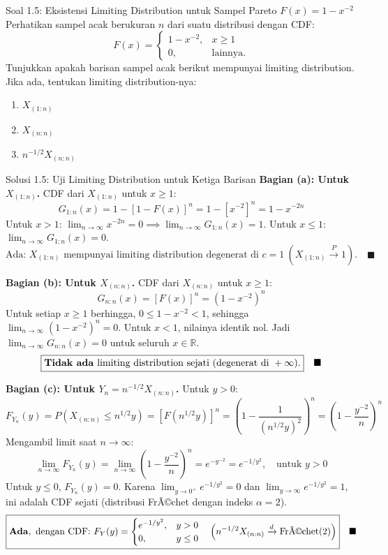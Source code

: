 \documentclass[10pt,twoside]{article}
\begin{document}
\begin{soalbox}{Soal 1.5: Eksistensi Limiting Distribution untuk Sampel Pareto $F(x) = 1 - x^{-2}$}
Perhatikan sampel acak berukuran $n$ dari suatu distribusi dengan CDF:
\[
F(x) = \begin{cases} 1 - x^{-2}, & x \ge 1 \\ 0, & \text{lainnya.} \end{cases}
\]
Tunjukkan apakah barisan sampel acak berikut mempunyai limiting distribution. Jika ada, tentukan limiting distribution-nya:
\begin{enumerate}[label=(\alph*)]
  \item $X_{(1:n)}$
  \item $X_{(n:n)}$
  \item $n^{-1/2}X_{(n:n)}$
\end{enumerate}
\end{soalbox}

\begin{solbox}{Solusi 1.5: Uji Limiting Distribution untuk Ketiga Barisan}
\textbf{Bagian (a): Untuk $X_{(1:n)}$.}
CDF dari $X_{(1:n)}$ untuk $x \ge 1$:
\[
G_{1:n}(x) = 1 - [1 - F(x)]^n = 1 - [x^{-2}]^n = 1 - x^{-2n}
\]
Untuk $x > 1$: $\lim_{n \to \infty} x^{-2n} = 0 \implies \lim_{n \to \infty} G_{1:n}(x) = 1$.
Untuk $x \le 1$: $\lim_{n \to \infty} G_{1:n}(x) = 0$.
\[
\boxed{\text{Ada: } X_{(1:n)} \text{ mempunyai limiting distribution degenerat di } c = 1 \ (X_{(1:n)} \xrightarrow{P} 1).} \quad \blacksquare
\]

\textbf{Bagian (b): Untuk $X_{(n:n)}$.}
CDF dari $X_{(n:n)}$ untuk $x \ge 1$:
\[
G_{n:n}(x) = [F(x)]^n = (1 - x^{-2})^n
\]
Untuk setiap $x \ge 1$ berhingga, $0 \le 1 - x^{-2} < 1$, sehingga $\lim_{n \to \infty} (1 - x^{-2})^n = 0$.
Untuk $x < 1$, nilainya identik nol. Jadi $\lim_{n \to \infty} G_{n:n}(x) = 0$ untuk seluruh $x \in \mathbb{R}$.
\[
\boxed{\text{\textbf{Tidak ada}} \text{ limiting distribution sejati (degenerat di }+\infty\text{)}.} \quad \blacksquare
\]

\textbf{Bagian (c): Untuk $Y_n = n^{-1/2}X_{(n:n)}$.}
Untuk $y > 0$:
\[
F_{Y_n}(y) = P(X_{(n:n)} \le n^{1/2}y) = [F(n^{1/2}y)]^n = \left(1 - \frac{1}{(n^{1/2}y)^2}\right)^n = \left(1 - \frac{y^{-2}}{n}\right)^n
\]
Mengambil limit saat $n \to \infty$:
\[
\lim_{n \to \infty} F_{Y_n}(y) = \lim_{n \to \infty} \left(1 - \frac{y^{-2}}{n}\right)^n = e^{-y^{-2}} = e^{-1/y^2}, \quad \text{untuk } y > 0
\]
Untuk $y \le 0$, $F_{Y_n}(y) = 0$.
Karena $\lim_{y \to 0^+} e^{-1/y^2} = 0$ dan $\lim_{y \to \infty} e^{-1/y^2} = 1$, ini adalah CDF sejati (distribusi FrÃ©chet dengan indeks $\alpha = 2$).
\[
\boxed{\text{\textbf{Ada}}, \text{ dengan CDF: } F_Y(y) = \begin{cases} e^{-1/y^2}, & y > 0 \\ 0, & y \le 0 \end{cases} \quad \left(n^{-1/2}X_{(n:n)} \xrightarrow{d} \text{FrÃ©chet}(2)\right)} \quad \blacksquare
\]
\end{solbox}
\end{document}
